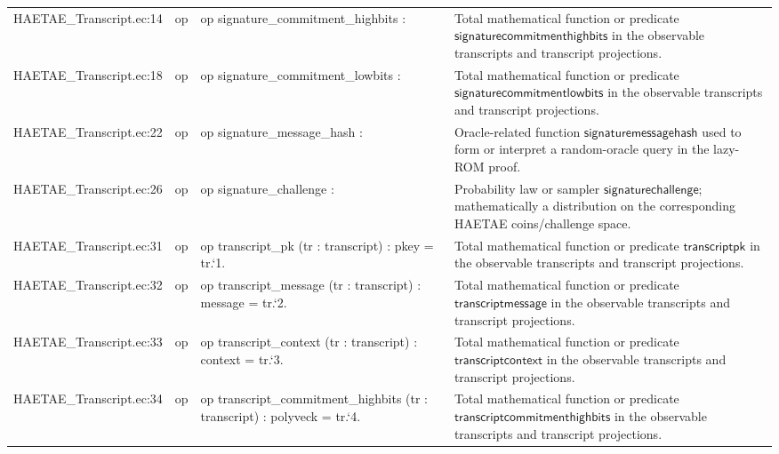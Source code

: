 \documentclass[10pt]{article}
\begin{document}
\begin{longtable}{L{0.11\textwidth}L{0.055\textwidth}L{0.385\textwidth}L{0.41\textwidth}}
HAETAE\_\allowbreak{}Transcript.\allowbreak{}ec:\allowbreak{}14 & op & {\ttfamily\scriptsize op signature\_\allowbreak{}commitment\_\allowbreak{}highbits :} & Total mathematical function or predicate $\mathsf{signaturecommitmenthighbits}$ in the observable transcripts and transcript projections. \\
HAETAE\_\allowbreak{}Transcript.\allowbreak{}ec:\allowbreak{}18 & op & {\ttfamily\scriptsize op signature\_\allowbreak{}commitment\_\allowbreak{}lowbits :} & Total mathematical function or predicate $\mathsf{signaturecommitmentlowbits}$ in the observable transcripts and transcript projections. \\
HAETAE\_\allowbreak{}Transcript.\allowbreak{}ec:\allowbreak{}22 & op & {\ttfamily\scriptsize op signature\_\allowbreak{}message\_\allowbreak{}hash :} & Oracle-related function $\mathsf{signaturemessagehash}$ used to form or interpret a random-oracle query in the lazy-ROM proof. \\
HAETAE\_\allowbreak{}Transcript.\allowbreak{}ec:\allowbreak{}26 & op & {\ttfamily\scriptsize op signature\_\allowbreak{}challenge :} & Probability law or sampler $\mathsf{signaturechallenge}$; mathematically a distribution on the corresponding HAETAE coins/challenge space. \\
HAETAE\_\allowbreak{}Transcript.\allowbreak{}ec:\allowbreak{}31 & op & {\ttfamily\scriptsize op transcript\_\allowbreak{}pk (tr : transcript) : pkey = tr.`1.} & Total mathematical function or predicate $\mathsf{transcriptpk}$ in the observable transcripts and transcript projections. \\
HAETAE\_\allowbreak{}Transcript.\allowbreak{}ec:\allowbreak{}32 & op & {\ttfamily\scriptsize op transcript\_\allowbreak{}message (tr : transcript) : message = tr.`2.} & Total mathematical function or predicate $\mathsf{transcriptmessage}$ in the observable transcripts and transcript projections. \\
HAETAE\_\allowbreak{}Transcript.\allowbreak{}ec:\allowbreak{}33 & op & {\ttfamily\scriptsize op transcript\_\allowbreak{}context (tr : transcript) : context = tr.`3.} & Total mathematical function or predicate $\mathsf{transcriptcontext}$ in the observable transcripts and transcript projections. \\
HAETAE\_\allowbreak{}Transcript.\allowbreak{}ec:\allowbreak{}34 & op & {\ttfamily\scriptsize op transcript\_\allowbreak{}commitment\_\allowbreak{}highbits (tr : transcript) : polyveck = tr.`4.} & Total mathematical function or predicate $\mathsf{transcriptcommitmenthighbits}$ in the observable transcripts and transcript projections. \\

\end{longtable}
\end{document}
